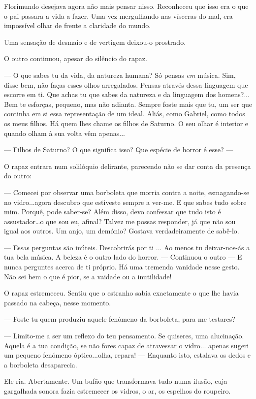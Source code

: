Florimundo desejava agora não mais pensar nisso. Reconheceu que isso era
o que o pai passara a vida a fazer. Uma vez mergulhando nas vísceras do
mal, era impossível olhar de frente a claridade do mundo.

Uma sensação de desmaio e de vertigem deixou-o prostrado.

O outro continuou, apesar do silêncio do rapaz.

--- O que sabes tu da vida, da natureza humana? Só pensas \emph{em}
música. Sim, disse bem, não faças esses olhos arregalados. Pensas
através dessa linguagem que escorre em ti. Que achas tu que sabes da
natureza e da linguagem dos homens?... Bem te esforças, pequeno, mas não
adianta. Sempre foste mais que tu, um ser que continha em si essa
representação de um ideal. Aliás, como Gabriel, como todos os meus
filhos. Há quem lhes chame os filhos de Saturno. O seu olhar é interior
e quando olham à sua volta vêm apenas...

--- Filhos de Saturno? O que significa isso? Que espécie de horror é esse?
--- 

O rapaz entrara num solilóquio delirante, parecendo não se dar conta da
presença do outro:

--- Comecei por observar uma borboleta que morria contra a noite,
esmagando-se no vidro...agora descubro que estiveste sempre a ver-me. E
que sabes tudo sobre mim. Porquê, pode saber-se? Além disso, devo
confessar que tudo isto é assustador\ldots{}o que sou eu, afinal? Talvez
me possas responder, já que não sou igual aos outros. Um anjo, um
demónio? Gostava verdadeiramente de sabê-lo.

--- Essas perguntas são inúteis. Descobrirás por ti ... Ao menos tu
deixar-nos-ás a tua bela música. A beleza é o outro lado do horror. ---
Continuou o outro --- E nunca perguntes acerca de ti próprio. Há uma
tremenda vanidade nesse gesto. Não sei bem o que é pior, se a vaidade ou
a inutilidade!

O rapaz estremeceu. Sentiu que o estranho sabia exactamente o que lhe
havia passado na cabeça, nesse momento.

--- Foste tu quem produziu aquele fenómeno da borboleta, para me testares?

--- Limito-me a ser um reflexo do teu pensamento. Se quiseres, uma
alucinação. Aquela é a tua condição, se não fores capaz de atravessar o
vidro... apenas sugeri um pequeno fenómeno óptico...olha, repara! ---
Enquanto isto, estalava os dedos e a borboleta desaparecia.

Ele ria. Abertamente. Um bufão que transformava tudo numa ilusão, cuja
gargalhada sonora fazia estremecer os vidros, o ar, os espelhos do
roupeiro.

